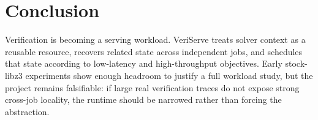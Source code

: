 \documentclass[10pt,twocolumn]{article}
\begin{document}
\section{Conclusion}
Verification is becoming a serving workload. VeriServe treats solver context as a reusable resource, recovers related state across independent jobs, and schedules that state according to low-latency and high-throughput objectives. Early stock-libz3 experiments show enough headroom to justify a full workload study, but the project remains falsifiable: if large real verification traces do not expose strong cross-job locality, the runtime should be narrowed rather than forcing the abstraction.



\end{document}
